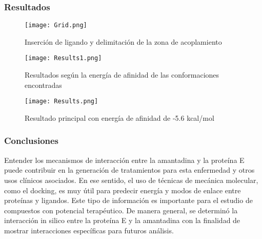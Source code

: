 \documentclass{beamer}
\begin{document}
\begin{frame}
\frametitle{Resultados}

\begin{figure}
    \centering
    \texttt{[image: Grid.png]}
    \caption{Inserción de ligando y delimitación de la zona de acoplamiento}
    \label{fig:Grid}
\end{figure}
    \end{frame}

\begin{frame}
\begin{figure}
    \centering
    \texttt{[image: Results1.png]}
    \caption{Resultados según la energía de afinidad de las conformaciones encontradas}
    \label{fig:Results1}
\end{figure}
    \end{frame}

\begin{frame}
\begin{figure}
    \centering
    \texttt{[image: Results.png]}
    \caption{Resultado principal con energía de afinidad de -5.6 kcal/mol}
    \label{fig:Results}
\end{figure}
    \end{frame}

\begin{frame}
\frametitle{Conclusiones}
Entender los mecanismos de interacción entre la amantadina y la proteína E puede contribuir en la generación de tratamientos para esta enfermedad y otros usos clínicos asociados. En ese sentido, el uso de técnicas de mecánica molecular, como el docking, es muy útil para predecir energía y modos de enlace entre proteínas y ligandos. Este tipo de información es importante para el estudio de compuestos con potencial terapéutico. De manera general, se determinó la interacción in silico entre la proteína E y la amantadina con la finalidad de mostrar interacciones específicas para futuros análisis. 

\end{frame}
\end{document}
